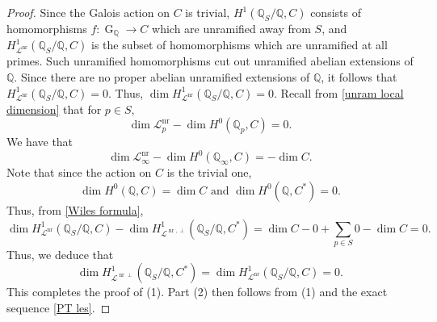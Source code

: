 \documentclass[11pt,reqno]{amsart}
\newcommand{\Q}{\mathbb{Q}}
\newcommand{\cL}{\mathcal{L}}
\newcommand{\op}[1]{\operatorname{#1}}
\numberwithin{equation}{section}
\begin{document}
\begin{proof}
    Since the Galois action on $C$ is trivial, $H^1(\Q_S/\Q, C)$ consists of homomorphisms $f: \op{G}_{\Q}\rightarrow C$ which are unramified away from $S$, and $H^1_{\cL^{\op{nr}}}(\Q_S/\Q, C)$ is the subset of homomorphisms which are unramified at all primes. Such unramified homomorphisms cut out unramified abelian extensions of $\Q$. Since there are no proper abelian unramified extensions of $\Q$, it follows that $H^1_{\cL^{\op{nr}}}(\Q_S/\Q, C)=0$. Thus, $\dim H^1_{\cL^{\op{nr}}}(\Q_S/\Q, C)=0$. Recall from \eqref{unram local dimension} that for $p\in S$, 
    \[\dim \cL_p^{\op{nr}}-\dim H^0(\Q_p, C)=0.\]
    We have that 
    \[\dim \cL_\infty^{\op{nr}}-\dim H^0(\Q_\infty, C)=-\dim C.\]
    Note that since the action on $C$ is the trivial one, 
    \[\dim H^0(\Q, C)=\dim C\text{ and } \dim H^0(\Q, C^*)=0. \]
    Thus, from \eqref{Wiles formula}, 
    \[\dim H^1_{\cL^{\op{nr}}}(\Q_S/\Q, C)-\dim H^1_{\cL^{\op{nr},\perp}}(\Q_S/\Q, C^*)=\dim C-0+\sum_{p\in S} 0 -\dim C=0.\] Thus, we deduce that 
    \[\dim H^1_{\cL^{\op{nr}\perp}}(\Q_S/\Q, C^*)=\dim H^1_{\cL^{\op{nr}}}(\Q_S/\Q, C)=0.\] This completes the proof of (1). Part (2) then follows from (1) and the exact sequence \eqref{PT les}.
\end{proof}
\end{document}
